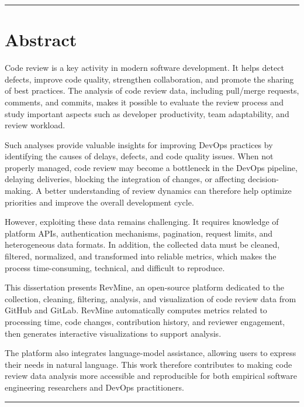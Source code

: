 \noindent\rule[2pt]{\textwidth}{0.9pt}

\clearpage

\section*{Abstract}

Code review is a key activity in modern software development. It helps detect defects, improve code quality, strengthen collaboration, and promote the sharing of best practices. The analysis of code review data, including pull/merge requests, comments, and commits, makes it possible to evaluate the review process and study important aspects such as developer productivity, team adaptability, and review workload.

Such analyses provide valuable insights for improving DevOps practices by identifying the causes of delays, defects, and code quality issues. When not properly managed, code review may become a bottleneck in the DevOps pipeline, delaying deliveries, blocking the integration of changes, or affecting decision-making. A better understanding of review dynamics can therefore help optimize priorities and improve the overall development cycle.

However, exploiting these data remains challenging. It requires knowledge of platform APIs, authentication mechanisms, pagination, request limits, and heterogeneous data formats. In addition, the collected data must be cleaned, filtered, normalized, and transformed into reliable metrics, which makes the process time-consuming, technical, and difficult to reproduce.

This dissertation presents RevMine, an open-source platform dedicated to the collection, cleaning, filtering, analysis, and visualization of code review data from GitHub and GitLab. RevMine automatically computes metrics related to processing time, code changes, contribution history, and reviewer engagement, then generates interactive visualizations to support analysis.

The platform also integrates language-model assistance, allowing users to express their needs in natural language. This work therefore contributes to making code review data analysis more accessible and reproducible for both empirical software engineering researchers and DevOps practitioners.

\vspace{1em}
\noindent\rule[2pt]{\textwidth}{0.5pt}

